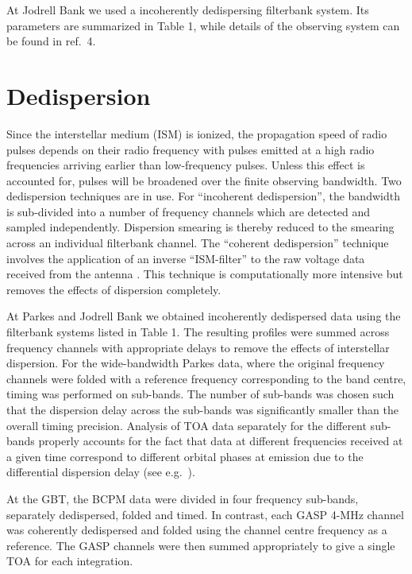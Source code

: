 \documentclass[12pt,psfig]{article}
\begin{document}
At Jodrell Bank we used a incoherently dedispersing filterbank system.  Its
parameters are summarized in Table 1, while details of the observing system
can be found in ref.~4\nocite{gl98}.

\section{Dedispersion}

Since the interstellar medium (ISM) is ionized, 
the propagation speed of radio pulses
depends on their radio frequency with pulses emitted at a high radio frequencies
arriving earlier than low-frequency pulses. Unless this effect is accounted for,
pulses will be broadened over the finite observing bandwidth. Two
dedispersion techniques are in use. For ``incoherent dedispersion'', the
bandwidth is sub-divided into a number of frequency channels which are
detected and sampled independently.  Dispersion smearing is thereby reduced to
the smearing across an individual filterbank channel. The ``coherent
dedispersion'' technique involves the application of an inverse 
``ISM-filter'' to the raw
voltage data received from the antenna \cite{hr75}. This technique is
computationally more intensive but removes the effects of dispersion
completely. 

At Parkes and Jodrell Bank we obtained incoherently dedispersed data using the
filterbank systems listed in Table 1. The resulting profiles were summed
across frequency channels with appropriate delays to remove the effects of
interstellar dispersion. For the wide-bandwidth Parkes data, where the
original frequency channels were folded with a reference frequency
corresponding to the band centre, timing was performed on sub-bands. The
number of sub-bands was chosen such that the dispersion delay across the
sub-bands was significantly smaller than the overall timing precision.
Analysis of TOA data separately for the different sub-bands properly accounts
for the fact that data at different frequencies received at a given time
correspond to different orbital phases at emission due to the differential
dispersion delay (see e.g.~\cite{hem06}).

At the GBT, the BCPM data were divided in four frequency sub-bands, separately
dedispersed, folded and timed. In contrast, each GASP 4-MHz channel was
coherently dedispersed and folded using the channel centre frequency as a
reference. The GASP channels were then summed appropriately to give a single
TOA for each integration.
\end{document}
